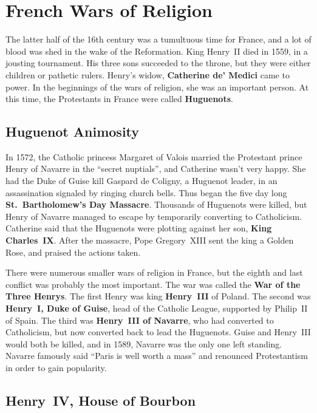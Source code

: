 \section{French Wars of Religion}

The latter half of the 16th century was a tumultuous time for France,
and a lot of blood was shed in the wake of the Reformation.
King Henry~II died in 1559, in a jousting tournament.
His three sons succeeded to the throne, but they were either children or pathetic rulers.
Henry's widow, \textbf{Catherine de' Medici} came to power.
In the beginnings of the wars of religion, she was an important person.
At this time, the Protestants in France were called \textbf{Huguenots}.

\subsection*{Huguenot Animosity}

In 1572, the Catholic princess Margaret of Valois married
the Protestant prince Henry of Navarre in the ``secret nuptials'', and Catherine wasn't very happy.
She had the Duke of Guise kill Gaspard de Coligny, a Huguenot leader,
in an assassination signaled by ringing church bells.
Thus began the five day long \textbf{St.\ Bartholomew's Day Massacre}.
Thousands of Huguenots were killed, but Henry of Navarre managed to escape by temporarily converting to Catholicism.
Catherine said that the Huguenots were plotting against her son, \textbf{King Charles~IX}\@.
After the massacre, Pope Gregory~XIII sent the king a Golden Rose, and praised the actions taken.

There were numerous smaller wars of religion in France, but the eighth and last conflict was probably the most important.
The war was called the \textbf{War of the Three Henrys}.
The first Henry was king \textbf{Henry~III} of Poland.
The second was \textbf{Henry~I, Duke of Guise}, head of the Catholic League, supported by Philip~II of Spain.
The third was \textbf{Henry~III of Navarre}, who had converted to Catholicism,
but now converted back to lead the Huguenots.
Guise and Henry~III would both be killed, and in 1589, Navarre was the only one left standing.
Navarre famously said ``Paris is well worth a mass'' and renounced Protestantism in order to gain popularity.

\subsection*{Henry~IV, House of Bourbon}

